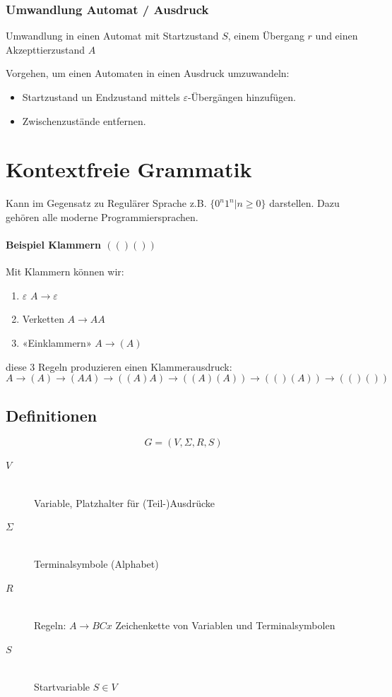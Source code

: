 \subsubsection{Umwandlung Automat / Ausdruck}
Umwandlung in einen Automat mit Startzustand $S$, einem Übergang $r$ und einen Akzepttierzustand $A$

Vorgehen, um einen Automaten in einen Ausdruck umzuwandeln:

\begin{itemize}
	\item Startzustand un Endzustand mittels $\varepsilon$-Übergängen hinzufügen.
	\item Zwischenzustände entfernen.
\end{itemize}

\section{Kontextfreie Grammatik}


Kann im Gegensatz zu Regulärer Sprache z.B. $\{0^n1^n | n \geq 0 \}$ darstellen. Dazu gehören alle moderne Programmiersprachen.

\paragraph{Beispiel Klammern $(()())$}

Mit Klammern können wir:

\begin{enumerate}
	\item $\varepsilon$ \hfill $A \to \varepsilon$
	\item Verketten \hfill $A \to AA$
	\item «Einklammern» \hfill $A \to (A)$
\end{enumerate}

diese 3 Regeln produzieren einen Klammerausdruck:
\[
	A \to (A) \to (AA) \to ((A)A) \to ((A)(A)) \to (()(A)) \to (()())
\]

\subsection{Definitionen}

\[
	G = (V, \Sigma, R, S)
\]

\begin{description}
	\item[$V$] \hfill \\
		Variable, Platzhalter für (Teil-)Ausdrücke
	\item[$\Sigma$] \hfill \\
		Terminalsymbole (Alphabet)
	\item[$R$] \hfill \\
		Regeln: $A \to BCx$ Zeichenkette von Variablen und Terminalsymbolen
	\item[$S$] \hfill \\
		Startvariable $S \in V$
\end{description}

